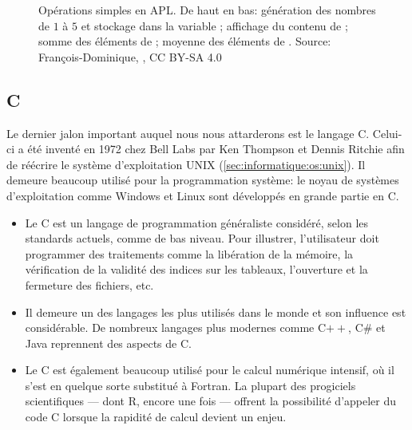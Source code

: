 \begin{figure}
  \centering
  \caption[Opérations simples en APL.]{Opérations simples en APL. De
    haut en bas: génération des nombres de $1$ à $5$ et stockage dans
    la variable ; affichage du contenu de ; somme des
    éléments de ; moyenne des éléments de . {\small Source:
    François-Dominique,
    , CC BY-SA 4.0}}
  \label{fig:informatique:apl}
\end{figure}

\subsection{C}
\label{sec:informatique:historique:c}

Le dernier jalon important auquel nous nous attarderons est le langage
C. Celui-ci a été inventé en 1972 chez Bell Labs par Ken Thompson et
Dennis Ritchie afin de réécrire le système d'exploitation UNIX
(\autoref{sec:informatique:os:unix}). Il demeure beaucoup utilisé pour
la programmation système: le noyau de systèmes d'exploitation comme
Windows et Linux sont développés en grande partie en C.
\begin{itemize}
\item Le C est un langage de programmation généraliste considéré,
  selon les standards actuels, comme de bas niveau. Pour illustrer,
  l'utilisateur doit programmer des traitements comme la libération de
  la mémoire, la vérification de la validité des indices sur les
  tableaux, l'ouverture et la fermeture des fichiers, etc.
\item Il demeure un des langages les plus utilisés dans le monde et
  son influence est considérable. De nombreux langages plus modernes
  comme C$++$, C\# et Java reprennent des aspects de C.
\item Le C est également beaucoup utilisé pour le calcul numérique
  intensif, où il s'est en quelque sorte substitué à Fortran. La
  plupart des progiciels scientifiques --- dont R, encore une fois ---
  offrent la possibilité d'appeler du code C lorsque la rapidité de
  calcul devient un enjeu.
\end{itemize}

